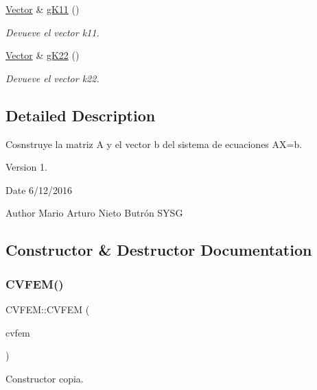 \begin{DoxyCompactItemize}
\hyperlink{class_vector}{Vector} \& \hyperlink{class_c_v_f_e_m_a8e29f1e40b135cee648e08fc151744c7}{g\+K11} ()
\begin{DoxyCompactList}\small\item\em Devueve el vector k11. \end{DoxyCompactList}\item 
\hyperlink{class_vector}{Vector} \& \hyperlink{class_c_v_f_e_m_af819a87944fdb7f338182ed8b92aaac6}{g\+K22} ()
\begin{DoxyCompactList}\small\item\em Devueve el vector k22. \end{DoxyCompactList}\end{DoxyCompactItemize}


\subsection{Detailed Description}
Cosnstruye la matriz A y el vector b del sistema de ecuaciones AX=b. 

\begin{DoxyVersion}{Version}
1. 
\end{DoxyVersion}
\begin{DoxyDate}{Date}
6/12/2016 
\end{DoxyDate}
\begin{DoxyAuthor}{Author}
Mario Arturo Nieto Butrón  S\+Y\+SG 
\end{DoxyAuthor}


\subsection{Constructor \& Destructor Documentation}
\hypertarget{class_c_v_f_e_m_a8382798f83bbe4aa428594c56966205c}{}\label{class_c_v_f_e_m_a8382798f83bbe4aa428594c56966205c} 
\subsubsection{\texorpdfstring{C\+V\+F\+E\+M()}{CVFEM()}}
{\footnotesize\ttfamily C\+V\+F\+E\+M\+::\+C\+V\+F\+EM (\begin{DoxyParamCaption}\item[{\hyperlink{class_c_v_f_e_m}{C\+V\+F\+EM} \&}]{cvfem }\end{DoxyParamCaption})}



Constructor copia. 


